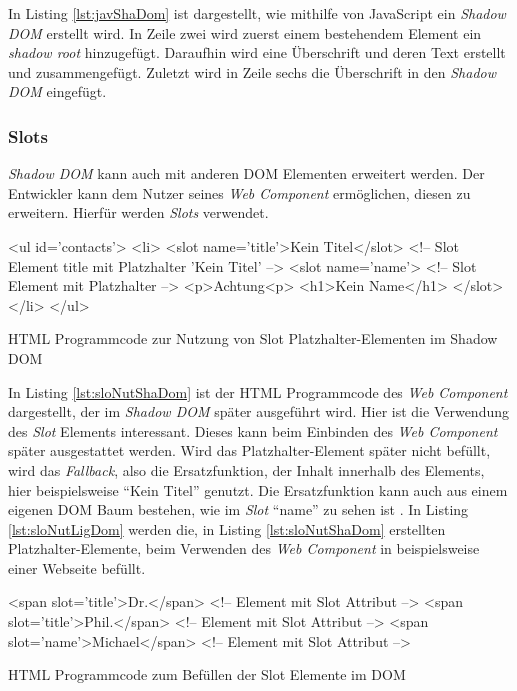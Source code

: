 \documentclass[12pt, paper=a4, bibtotoc, toc=listof, headsepline=true, numbers=endperiod]{scrreprt}
\begin{document}
		In Listing \ref{lst:javShaDom} ist dargestellt, wie mithilfe von JavaScript ein \emph{Shadow \ac{DOM}} erstellt wird. In Zeile zwei wird zuerst einem bestehendem Element ein \emph{shadow root} hinzugefügt. Daraufhin wird eine Überschrift und deren Text erstellt und zusammengefügt. Zuletzt wird in Zeile sechs die Überschrift in den \emph{Shadow \ac{DOM}} eingefügt.
			\subsubsection{Slots}
			\emph{Shadow \ac{DOM}} kann auch mit anderen \ac{DOM} Elementen erweitert werden. Der Entwickler kann dem Nutzer seines \emph{Web Component} ermöglichen, diesen zu erweitern. Hierfür werden \emph{Slots} verwendet. 
			\begin{listing}
				\begin{HTMLcode*}{}
<ul id='contacts'>
   <li>
      <slot name='title'>Kein Titel</slot> <!-- Slot Element title mit Platzhalter 'Kein Titel' -->
      <slot name='name'> <!-- Slot Element mit Platzhalter -->
         <p>Achtung<p>
         <h1>Kein Name</h1>
      </slot>
   </li>
</ul>
				\end{HTMLcode*}
				\caption[Slot Elemente im Shadow DOM]{HTML Programmcode zur Nutzung von Slot Platzhalter-Elementen im Shadow DOM}
				\label{lst:sloNutShaDom}
			\end{listing}\noindent
			In Listing \ref{lst:sloNutShaDom} ist der \ac{HTML} Programmcode des \emph{Web Component} dargestellt, der im \emph{Shadow \ac{DOM}} später ausgeführt wird. Hier ist die Verwendung des \emph{Slot} Elements interessant. Dieses kann beim Einbinden des \emph{Web Component} später ausgestattet werden. Wird das Platzhalter-Element später nicht befüllt, wird das \emph{Fallback}, also die Ersatzfunktion, der Inhalt innerhalb des Elements, hier beispielsweise \enquote{Kein Titel} genutzt. Die Ersatzfunktion kann auch aus einem eigenen \ac{DOM} Baum bestehen, wie im \emph{Slot} \enquote{name} zu sehen ist \cite{Bidelman2016}. In Listing \ref{lst:sloNutLigDom} werden die, in Listing \ref{lst:sloNutShaDom} erstellten Platzhalter-Elemente, beim Verwenden des \emph{Web Component} in beispielsweise einer Webseite befüllt.
			\begin{listing}[H]
				\begin{HTMLcode*}{}
<span slot='title'>Dr.</span> <!-- Element mit Slot Attribut -->
<span slot='title'>Phil.</span> <!-- Element mit Slot Attribut -->
<span slot='name'>Michael</span> <!-- Element mit Slot Attribut -->
				\end{HTMLcode*}
				\caption[Befüllen der Slot Elemente im DOM]{HTML Programmcode zum Befüllen der Slot Elemente im DOM}
				\label{lst:sloNutLigDom}
			\end{listing}\noindent
\end{document}
